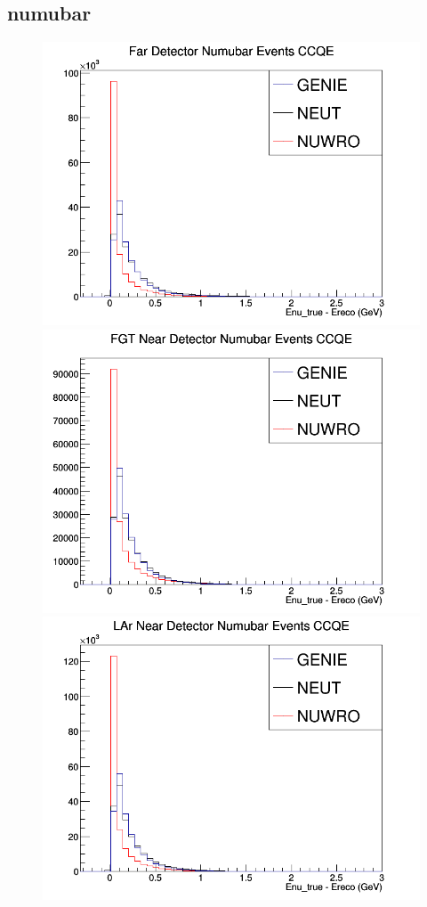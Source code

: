\subsection{numubar}
\begin{figure}[h]
\includegraphics[width=\linewidth]{Ereco_Etrue/numubar_FD_CCQE.png}
\endminipage
{}
\includegraphics[width=\linewidth]{Ereco_Etrue/numubar_FGT_CCQE.png}
\endminipage
{}
\includegraphics[width=\linewidth]{Ereco_Etrue/numubar_LAr_CCQE.png}

\end{figure}
